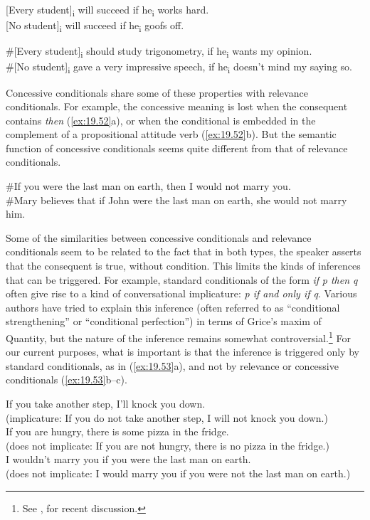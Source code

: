 \ea \label{ex:19.50}
\ea {} [Every student]\textsubscript{i} will succeed if he\textsubscript{i} works hard.\\
\ex{} [No student]\textsubscript{i} will succeed if he\textsubscript{i} goofs off.
\z
\z

\ea \label{ex:19.51}
\ea  \#[Every student]\textsubscript{i} should study trigonometry, if he\textsubscript{i} wants my opinion.\\
\ex \#[No student]\textsubscript{i} gave a very impressive speech, if he\textsubscript{i} doesn’t mind my saying so.
\z
\z

Concessive conditionals share some of these properties with relevance conditionals. For example, the concessive meaning is lost when the consequent contains \textit{then} (\ref{ex:19.52}a), or when the conditional is embedded in the complement of a propositional attitude verb (\ref{ex:19.52}b). But the semantic function of concessive conditionals seems quite different from that of relevance conditionals.


\ea \label{ex:19.52}
\ea  \#If you were the last man on earth, then I would not marry you.\\
\ex \#Mary believes that if John were the last man on earth, she would not marry him.
\z
\z


Some of the similarities between concessive conditionals and relevance conditionals seem to be related to the fact that in both types, the speaker asserts that the consequent is true, without condition. This limits the kinds of inferences that can be triggered. For example, standard conditionals of the form \textit{if} \textit{p then q} often give rise to a kind of  conversational implicature: \textit{p if and only if q}. Various authors have tried to explain this inference (often referred to as “conditional strengthening” or “conditional perfection”) in terms of Grice’s maxim of Quantity, but the nature of the inference remains somewhat controversial.\footnote{See \citet{Horn2000}, \citet{vonFintel2001} for recent discussion.} For our current purposes, what is important is that the inference is triggered only by standard conditionals, as in (\ref{ex:19.53}a), and not by relevance or concessive conditionals (\ref{ex:19.53}b--c).


\ea \label{ex:19.53}
\ea  If you take another step, I’ll knock you down.\\
  (implicature: If you do not take another step, I will not knock you down.)\\
\ex If you are hungry, there is some pizza in the fridge.\\
  (does not implicate: If you are not hungry, there is no pizza in the fridge.)\\
\ex I wouldn’t marry you if you were the last man on earth.\\
  (does not implicate: I would marry you if you were not the last man on earth.)
\z
\z



